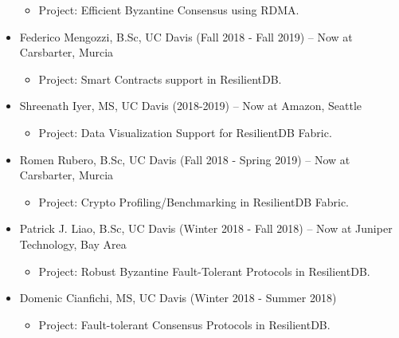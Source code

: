 \documentclass[10pt]{article}
\begin{document}
\begin{itemize}
\begin{itemize}
	\item Project: Efficient Byzantine Consensus using RDMA.
	\end{itemize}
\item Federico Mengozzi, B.Sc, UC Davis (Fall 2018 - Fall 2019) -- Now at Carsbarter, Murcia 
	\begin{itemize}\vspace{-2mm}
	\item Project: Smart Contracts support in ResilientDB.
	\end{itemize}
\item Shreenath Iyer, MS, UC Davis (2018-2019) -- Now at Amazon, Seattle 
	\begin{itemize}\vspace{-2mm}
	\item Project: Data Visualization Support for ResilientDB Fabric.
	\end{itemize}
\item Romen Rubero, B.Sc, UC Davis (Fall 2018 - Spring 2019) -- Now at Carsbarter, Murcia
	\begin{itemize}\vspace{-2mm}
	\item Project: Crypto Profiling/Benchmarking in ResilientDB Fabric.
	\end{itemize}
\item Patrick J. Liao, B.Sc, UC Davis (Winter 2018 - Fall 2018) -- Now at Juniper Technology, Bay Area 
	\begin{itemize}\vspace{-2mm}
	\item Project: Robust Byzantine Fault-Tolerant Protocols in ResilientDB.
	\end{itemize}
\item Domenic Cianfichi, MS, UC Davis (Winter 2018 - Summer 2018)
	\begin{itemize}\vspace{-2mm}
	\item Project: Fault-tolerant Consensus Protocols in ResilientDB.
	\end{itemize}
\end{itemize}
\end{document}
